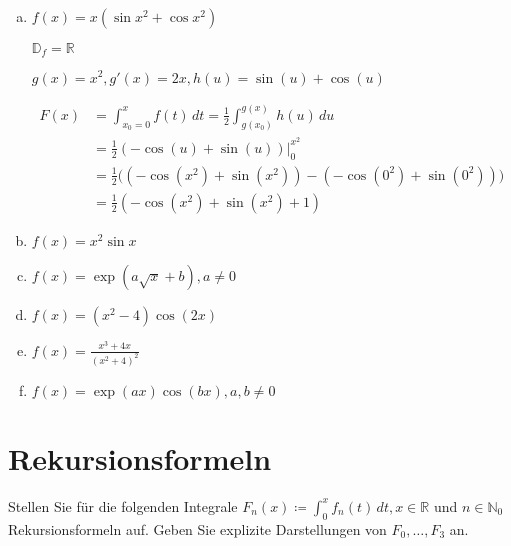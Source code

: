 \documentclass{article}
\begin{document}
\begin{enumerate}[a)]
\item $f(x) = x (\sin x^2 + \cos x^2)$

  $\mathbb{D}_f = \mathbb{R}$

  $g(x) = x^2, g'(x) = 2x, h(u) = \sin(u) + \cos(u)$

  \begin{align*}
    F(x) &= \int_{x_0 = 0}^x f(t) \,dt = \frac{1}{2} \int_{g(x_0)}^{g(x)} h(u) \,du \\
         &= \frac{1}{2}(- \cos(u) + \sin(u)) {\Big |}_0^{x^2} \\
         &= \frac{1}{2} {\Big (}\left( - \cos\left( x^2 \right) + \sin\left( x^2 \right) \right) -
           \left( - \cos\left( 0^2 \right) + \sin\left( 0^2 \right) \right){\Big )} \\
         &= \frac{1}{2} ( - \cos(x^2) + \sin(x^2) + 1)
  \end{align*}
\item $f(x) = x^2 \sin x$
\item $f(x) = \exp\left( a \sqrt{x} + b \right), a \ne 0$
\item $f(x) = (x^2 -  4) \cos(2x)$
\item $f(x) = \frac{x^3 + 4x}{(x^2 + 4)^2}$
\item $f(x) = \exp(ax) \cos(bx), a, b \ne 0$

\end{enumerate}

\section*{Rekursionsformeln}

Stellen Sie für die folgenden Integrale
$F_n (x) \coloneqq \int_0^x f_n(t) \,dt, x \in \mathbb{R}$ und
$n \in \mathbb{N}_0$ Rekursionsformeln auf.
Geben Sie explizite Darstellungen von $F_0, \ldots, F_3$ an.

  
\end{document}

